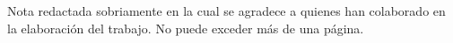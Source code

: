 Nota redactada sobriamente en la cual se agradece a quienes han colaborado en la elaboración del trabajo. No puede exceder más de una página.